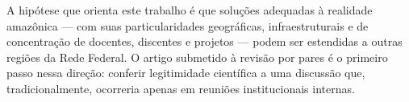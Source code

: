 \documentclass[english, spanish, brazilian]{RBIEarticle}
\begin{document}
	A hipótese que orienta este trabalho é que soluções adequadas à realidade amazônica — com suas particularidades geográficas, infraestruturais e de concentração de docentes, discentes e projetos — podem ser estendidas a outras regiões da Rede Federal. O artigo submetido à revisão por pares é o primeiro passo nessa direção: conferir legitimidade científica a uma discussão que, tradicionalmente, ocorreria apenas em reuniões institucionais internas.
	


	
\end{document}
